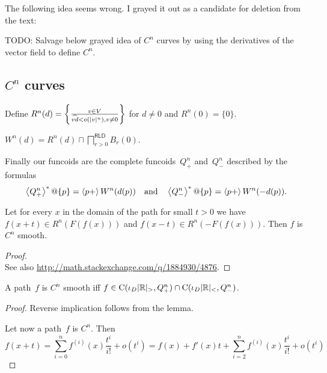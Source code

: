 The following idea seems wrong. I grayed it out as a candidate for deletion from the text:

TODO: Salvage below grayed idea of $C^n$ curves by using the
derivatives of the vector field to define $C^n$.

\begin{grayed}

\subsection{$C^n$ curves}


Define $R^n(d) = \left\{ \frac{v\in V}{\widehat{vd}<o(|v|^n), v\ne 0}\right\}$ for $d\ne 0$ and $R^n(0) = \{0\}$.

\begin{defn}
$W^n(d) = R^n(d) \sqcap \bigsqcap^{\mathsf{RLD}}_{r>0}B_r(0)$.
\end{defn}

Finally our funcoids are the complete funcoids~$Q_+^n$ and~$Q_-^n$ described by the formulas
\[
\left\langle Q_+^n\right\rangle ^{\ast}@\{p\} = \left\langle p+\right\rangle W^n(d(p)) \quad\text{and}\quad \left\langle Q_-^n\right\rangle ^{\ast}@\{p\} = \left\langle p+\right\rangle W^n(-d(p)).
\]

\begin{lem}
Let for every $x$ in the domain of the path for small $t > 0$ we have $f (x + t) \in R^n (F (f (x)))$ and $f (x - t) \in R^n (- F (f (x)))$.
Then $f$ is $C^n$ smooth.
\end{lem}

\begin{proof}
\\
See also \url{http://math.stackexchange.com/q/1884930/4876}.
\end{proof}

\begin{conjecture}
A path~$f$ is $C^n$ smooth iff $f\in\mathrm{C}(\iota_D|\mathbb{R}|_{>},Q_+^n)\cap\mathrm{C}(\iota_D|\mathbb{R}|_{<},Q_-^n)$.
\end{conjecture}

\begin{proof}
Reverse implication follows from the lemma.

Let now a path~$f$ is $C^n$. Then
\[
f(x+t) = \sum_{i=0}^n f^{(i)}(x)\frac{t^i}{i!} + o(t^i) =
f(x)+f'(x)t + \sum_{i=2}^n f^{(i)}(x)\frac{t^i}{i!} + o(t^i)
\]
\end{proof}

\end{grayed}

